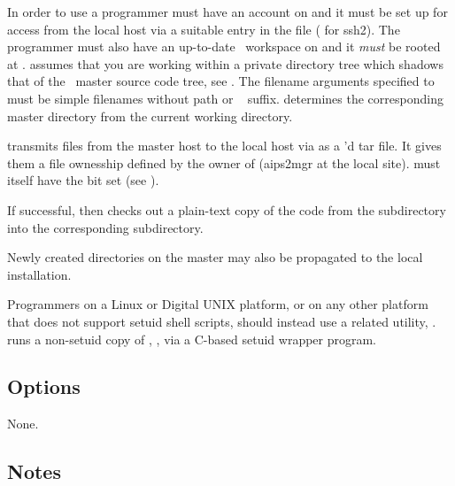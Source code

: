 In order to use  a programmer must have an account on
 and it must be set up for  access from the
local host via a suitable entry in the  file
( for ssh2).  The programmer
must also have an up-to-date \aipspp\ workspace on  and
it \emph{must} be  rooted at .
 assumes that you are working within a private directory tree which
shadows that of the \aipspp\ master source code tree, see .
The filename arguments specified to  must be simple filenames without
path or \rcs\  suffix.   determines the corresponding master
directory from the current working directory.

 transmits files from the master host to the local host via
 as a 'd tar file.  It gives them a file ownesship
defined by the owner of  (aips2mgr at the local site).  
must itself have the  bit set (see ).
 
If successful,  then checks out a plain-text copy of the code from the
 subdirectory into the corresponding 
subdirectory.
 
Newly created directories on the master may also be propagated to the local
installation.

Programmers on a Linux or Digital UNIX platform, or on any other
platform that does not support setuid shell scripts, should instead use
a related utility, .   runs a non-setuid copy of
, , via a C-based setuid wrapper program.
 
\subsection*{Options}
 
None.

\subsection*{Notes}
 

